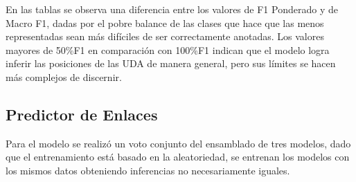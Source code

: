 \documentclass[a4paper,11pt,twocolumn,twoside]{article}
\begin{document}
En las tablas se observa una diferencia entre los valores de F1 Ponderado y 
de Macro F1, dadas por el pobre balance de las clases que hace que las menos
representadas sean más difíciles de ser correctamente anotadas. Los valores
mayores de 50\%F1 en comparación con 100\%F1 indican que el modelo logra 
inferir las posiciones de las UDA de manera general, pero sus límites se hacen 
más complejos de discernir. 

\subsection{Predictor de Enlaces}

Para el modelo se realizó un voto conjunto del ensamblado de tres modelos, dado que el entrenamiento 
está basado en la aleatoriedad, se entrenan los modelos con los mismos datos obteniendo inferencias no
necesariamente iguales.

\end{document}
